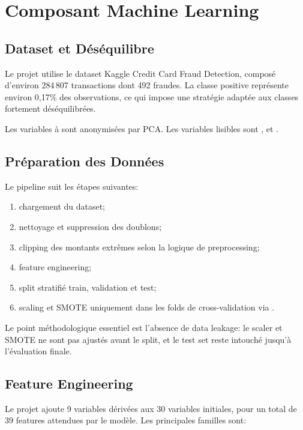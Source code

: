 \chapter{Composant Machine Learning}

\section{Dataset et Déséquilibre}

Le projet utilise le dataset Kaggle Credit Card Fraud Detection, composé d'environ 284\,807 transactions dont 492 fraudes. La classe positive représente environ 0,17\% des observations, ce qui impose une stratégie adaptée aux classes fortement déséquilibrées.

Les variables  à  sont anonymisées par PCA. Les variables lisibles sont ,  et .

\section{Préparation des Données}

Le pipeline suit les étapes suivantes:

\begin{enumerate}
    \item chargement du dataset;
    \item nettoyage et suppression des doublons;
    \item clipping des montants extrêmes selon la logique de preprocessing;
    \item feature engineering;
    \item split stratifié train, validation et test;
    \item scaling et SMOTE uniquement dans les folds de cross-validation via .
\end{enumerate}

Le point méthodologique essentiel est l'absence de data leakage: le scaler et SMOTE ne sont pas ajustés avant le split, et le test set reste intouché jusqu'à l'évaluation finale.

\section{Feature Engineering}

Le projet ajoute 9 variables dérivées aux 30 variables initiales, pour un total de 39 features attendues par le modèle. Les principales familles sont:

